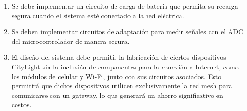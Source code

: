 \documentclass[
11pt, %
]{charter}
\begin{document}
\begin{enumerate}
\begin{enumerate}
			\item Se debe implementar un circuito de carga de batería que permita su recarga segura cuando el sistema esté conectado a la red eléctrica.
			\item Se deben implementar circuitos de adaptación para medir señales con el ADC del microcontrolador de manera segura.
			\item  El diseño del sistema debe permitir la fabricación de ciertos dispositivos CityLight sin la inclusión de componentes para la conexión a Internet, como los módulos de celular y Wi-Fi, junto con sus circuitos asociados. Esto permitirá que dichos dispositivos utilicen exclusivamente la red mesh para comunicarse con un gateway, lo que generará un ahorro significativo en costos.
		\end{enumerate}


\end{enumerate}
\end{document}
